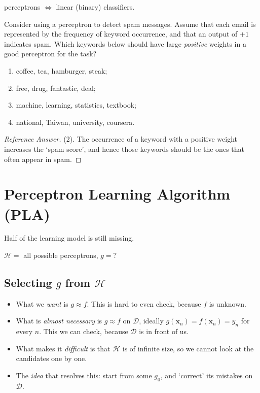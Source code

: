 \begin{moral}
    perceptrons \(\iff\) linear (binary) classifiers.
\end{moral}

\begin{exercise}
    Consider using a perceptron to detect spam messages. Assume that each email
    is represented by the frequency of keyword occurrence, and that an output of
    \(+1\) indicates spam. Which keywords below should have large \emph{positive}
    weights in a good perceptron for the task?
    \begin{enumerate}[(1)]
        \item coffee, tea, hamburger, steak;
        \item free, drug, fantastic, deal;
        \item machine, learning, statistics, textbook;
        \item national, Taiwan, university, coursera.
    \end{enumerate}
\end{exercise}

\begin{proof}[Reference Answer]
    (2). The occurrence of a keyword with a positive weight increases the `spam
    score', and hence those keywords should be the ones that often appear in
    spam.
\end{proof}

\section{Perceptron Learning Algorithm (PLA)}\label{sec:pla}


Half of the learning model is still missing.

\begin{question}
    \(\mathcal{H} = \) all possible perceptrons, \(g = ?\)
\end{question}

\subsection{Selecting \texorpdfstring{\(g\)}{g} from
\texorpdfstring{\(\mathcal{H}\)}{H}}

\begin{itemize}
    \item What we \emph{want} is \(g \approx f\). This is hard to even check,
        because \(f\) is unknown.
    \item What is \emph{almost necessary} is \(g \approx f\) on \(\mathcal{D}\),
        ideally \(g(\bm{x}_n) = f(\bm{x}_n) = y_n\) for every \(n\). This we can
        check, because \(\mathcal{D}\) is in front of us.
    \item What makes it \emph{difficult} is that \(\mathcal{H}\) is of infinite
        size, so we cannot look at the candidates one by one.
    \item The \emph{idea} that resolves this: start from some \(g_0\), and
        `correct' its mistakes on \(\mathcal{D}\).
\end{itemize}

